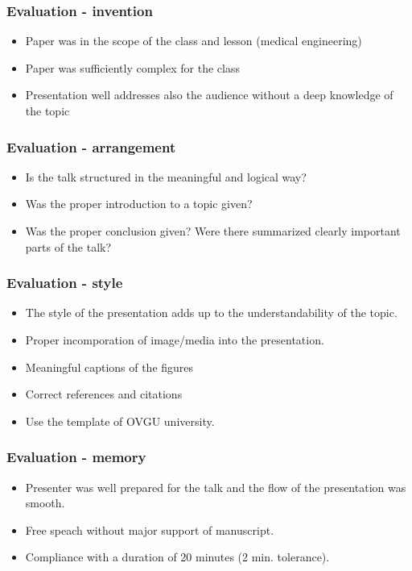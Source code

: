 \begin{frame}
\frametitle{Evaluation - invention}
\begin{itemize}
      \item{Paper was in the scope of the class and lesson (medical engineering)}
      \item{Paper was sufficiently complex for the class}
      \item{Presentation well addresses also the audience without a deep knowledge of the topic}
\end{itemize}
\end{frame}

\begin{frame}
\frametitle{Evaluation - arrangement}
\begin{itemize}
      \item{Is the talk structured in the meaningful and logical way?}
      \item{Was the proper introduction to a topic given?}
      \item{Was the proper conclusion given? Were there summarized clearly important parts of the talk?}
\end{itemize}
\end{frame}

\begin{frame}
\frametitle{Evaluation - style}
\begin{itemize}
      \item{The style of the presentation adds up to the understandability of the topic.}
      \item{Proper incomporation of image/media into the presentation.}
      \item{Meaningful captions of the figures}
      \item{Correct references and citations}
      \item{Use the template of OVGU university.}
\end{itemize}
\end{frame}

\begin{frame}
\frametitle{Evaluation - memory}
\begin{itemize}
      \item{Presenter was well prepared for the talk and the flow of the presentation was smooth.}
      \item{Free speach without major support of manuscript.}
      \item{Compliance with a duration of 20 minutes (2 min. tolerance).}
\end{itemize}
\end{frame}

